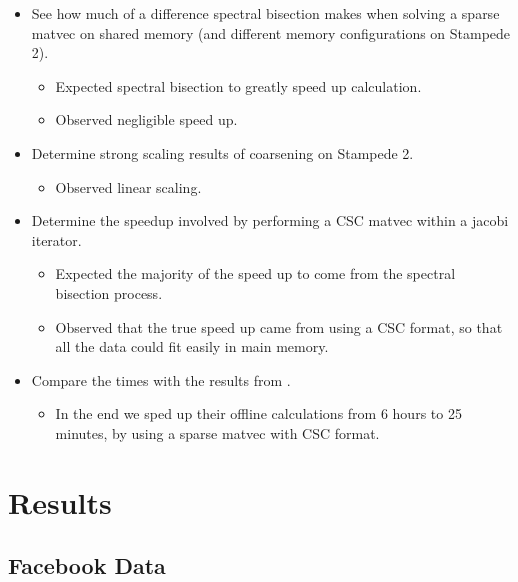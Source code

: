 \documentclass[11pt]{article}
\begin{document}
\begin{itemize}
	\item See how much of a difference spectral bisection makes when solving
		a sparse matvec on shared memory (and different memory
		configurations on Stampede 2). 
		\begin{itemize}
			\item Expected spectral bisection to greatly speed up
				calculation. 
			\item Observed negligible speed up.
		\end{itemize}
	
	\item Determine strong scaling results of coarsening on Stampede 2. 
		\begin{itemize}
			\item Observed linear scaling. 
		\end{itemize}
	\item Determine the speedup involved by performing a CSC matvec within a
		jacobi iterator. 
		\begin{itemize}
			\item Expected the majority of the speed up to come from
				the spectral bisection process. 
			\item Observed that the true speed up came from using a
				CSC format, so that all the data could fit
				easily in main memory. 
		\end{itemize}
	\item Compare the times with the results from \cite{xie}.
		\begin{itemize}
			\item In the end we sped up their offline calculations
				from 6 hours to 25 minutes, by using a sparse
				matvec with CSC format. 
		\end{itemize}
\end{itemize}

\section{Results}
\subsection{Facebook Data}
\end{document}

